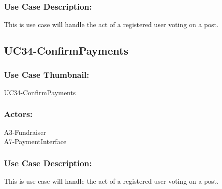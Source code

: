 \documentclass[11pt, openany]{report}
\begin{document}
\subsubsection*{Use Case Description:}
This is use case will handle the act of a registered user voting on a post.

\subsection{UC34-ConfirmPayments}
\label{sUC34}
\subsubsection*{Use Case Thumbnail:}
UC34-ConfirmPayments
\subsubsection*{Actors:}
A3-Fundraiser\\
A7-PaymentInterface\\
\subsubsection*{Use Case Description:}
This is use case will handle the act of a registered user voting on a post.
\end{document}
